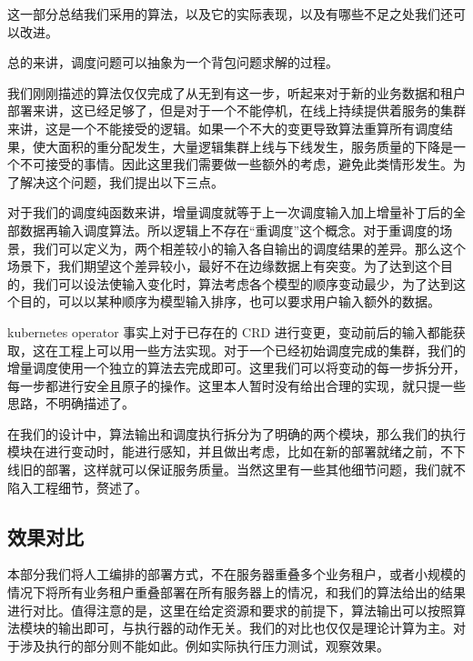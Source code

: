 这一部分总结我们采用的算法，以及它的实际表现，以及有哪些不足之处我们还可以改进。



总的来讲，调度问题可以抽象为一个背包问题求解的过程。


我们刚刚描述的算法仅仅完成了从无到有这一步，听起来对于新的业务数据和租户部署来讲，这已经足够了，但是对于一个不能停机，在线上持续提供着服务的集群来讲，这是一个不能接受的逻辑。如果一个不大的变更导致算法重算所有调度结果，使大面积的重分配发生，大量逻辑集群上线与下线发生，服务质量的下降是一个不可接受的事情。因此这里我们需要做一些额外的考虑，避免此类情形发生。为了解决这个问题，我们提出以下三点。


对于我们的调度纯函数来讲，增量调度就等于上一次调度输入加上增量补丁后的全部数据再输入调度算法。所以逻辑上不存在“重调度”这个概念。对于重调度的场景，我们可以定义为，两个相差较小的输入各自输出的调度结果的差异。那么这个场景下，我们期望这个差异较小，最好不在边缘数据上有突变。为了达到这个目的，我们可以设法使输入变化时，算法考虑各个模型的顺序变动最少，为了达到这个目的，可以以某种顺序为模型输入排序，也可以要求用户输入额外的数据。


kubernetes operator 事实上对于已存在的 CRD 进行变更，变动前后的输入都能获取，这在工程上可以用一些方法实现。对于一个已经初始调度完成的集群，我们的增量调度使用一个独立的算法去完成即可。这里我们可以将变动的每一步拆分开，每一步都进行安全且原子的操作。这里本人暂时没有给出合理的实现，就只提一些思路，不明确描述了。



在我们的设计中，算法输出和调度执行拆分为了明确的两个模块，那么我们的执行模块在进行变动时，能进行感知，并且做出考虑，比如在新的部署就绪之前，不下线旧的部署，这样就可以保证服务质量。当然这里有一些其他细节问题，我们就不陷入工程细节，赘述了。


\subsection{效果对比}

本部分我们将人工编排的部署方式，不在服务器重叠多个业务租户，或者小规模的情况下将所有业务租户重叠部署在所有服务器上的情况，和我们的算法给出的结果进行对比。值得注意的是，这里在给定资源和要求的前提下，算法输出可以按照算法模块的输出即可，与执行器的动作无关。我们的对比也仅仅是理论计算为主。对于涉及执行的部分则不能如此。例如实际执行压力测试，观察效果。

